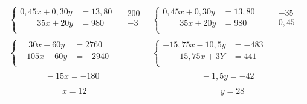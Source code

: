 \begin{enumerate}
\begin{tabular}{lp{3cm}ll}
\begin{minipage}{4cm}
$\begin{cases}
  0,45x + 0,30y \!\!\!\!\!\!\!\! &= 13,80\\
  \qquad  35x + 20y \!\!\!\!\!\!\!\! &= 980\\
\end{cases}$ 
\end{minipage}  &  \multicolumn{1}{|l}{$\begin{array}{l}
                     200\\ -3 \\ 
                  \end{array}$ } & 
                   \begin{minipage}{4cm}
                   $\begin{cases}
                        0,45x + 0,30y \!\!\!\!\!\!\!\! &= 13,80\\
                        \qquad  35x + 20y\!\!\!\!\!\!\!\! &= 980\\
                   \end{cases} $ 
                \end{minipage} &  \multicolumn{1}{|l}{ $\begin{array}{l}
                                        -35\\0,45\\ 
                                  \end{array}$}\\
& & & \\
\begin{minipage}{3cm}
$\begin{cases}
   \quad 30x   +60y \!\!\!\!\!\!\!\!&= 2760\\
   -105x -60y \!\!\!\!\!\!\!\! &= -2940\\
\end{cases}$ 
\end{minipage}  &  & 
                   \begin{minipage}{3cm}
                   $\begin{cases}
                        -15,75x -10,5y \!\!\!\!\!\!\!\!&= -483\\
                         \qquad  15,75x  +3Y   \!\!\!\!\!\!\!\!&= 441\\
                   \end{cases} $ 
                \end{minipage} &  \\
\cline{1-1} \cline{3-3}
\multicolumn{1}{l}{$\qquad \qquad \;  -15x = -180$ } && \multicolumn{1}{l}{$\qquad \qquad \quad \;\;\;  -1,5y = -42$} & \\
$\qquad \qquad \qquad \; x = 12$ && $\qquad \qquad \qquad \quad \;\;\;\; y = 28$ & \\
\end{tabular}\\



\end{enumerate}
